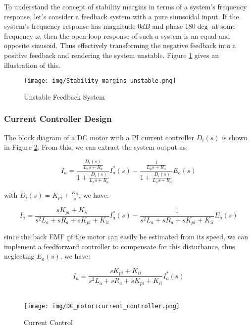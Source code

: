 \documentclass[a4paper]{article}
\begin{document}
To understand the concept of stability margins in terms of a system's frequency response, let's consider a feedback system with a pure sinusoidal input. 
If the system's frequency response has magnitude $0dB$ and phase $180\deg$ at some frequency $\omega$, 
then the open-loop response of such a system is an equal and opposite sinusoid. 
Thus effectively transforming the negative feedback into a positive feedback and rendering the system unstable. 
Figure \ref{fig:Stability_mar_unst} gives an illustration of this.
\\
\begin{figure}
        \centering
        \texttt{[image: img/Stability\_margins\_unstable.png]}
        \caption{Unstable Feedback System \cite{kim17}}
        \label{fig:Stability_mar_unst}
\end{figure}


\subsubsection{Current Controller Design}

The block diagram of a DC motor with a PI current controller $D_{i}(s)$ is shown in Figure \ref{fig:DC_current_ctrl}. 
From this, we can extract the system output as: 

$$ I_{a}= \frac{ \frac{D_{i}(s)}{L_{a} s + R_{a}} }{ 1 + \frac{D_{i}(s)}{L_{a} s + R_{a}} } I_{a}^{*}(s) 
        - \frac{ \frac{1}{L_{a} s + R_{a}} }{ 1 + \frac{D_{i}(s)}{L_{a} s + R_{a}} } E_{a}(s) $$

with $D_{i}(s)= K_{pi} + \frac{K_{ii}}{s}$, we have:

$$ I_{a}= \frac{ s K_{pi} + K_{ii} }{ s^{2} L_{a} + s R_{a} + s K_{pi} + K_{ii} } I_{a}^{*}(s) 
        - \frac{1}{ s^{2} L_{a} + s R_{a} + s K_{pi} + K_{ii} } E_{a}(s) $$

since the back EMF pf the motor can easily be estimated from its speed, we can implement a feedforward controller to compensate for this disturbance, 
thus neglecting $E_{a}(s)$, we have:

$$ I_{a}= \frac{ s K_{pi} + K_{ii} }{ s^{2} L_{a} + s R_{a} + s K_{pi} + K_{ii} } I_{a}^{*}(s) $$
\\

\begin{figure}
        \centering
        \texttt{[image: img/DC\_motor+current\_controller.png]}
        \caption{Current Control \cite{kim17}}
        \label{fig:DC_current_ctrl}
\end{figure}
\end{document}
